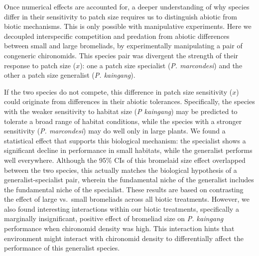 Once numerical effects are accounted for, a deeper understanding of why
species differ in their sensitivity to patch size requires us to
distinguish abiotic from biotic mechanisms. This is only possible with
manipulative experiments. Here we decoupled interspecific competition
and predation from abiotic differences between small and large
bromeliads, by experimentally manipulating a pair of congeneric
chironomids. This species pair was divergent the strength of their
response to patch size (\(x\)): one a patch size specialist (\emph{P.
marcondesi}) and the other a patch size generalist (\emph{P. kaingang}).

If the two species do not compete, this difference in patch size
sensitivity (\(x\)) could originate from differences in their abiotic
tolerances. Specifically, the species with the weaker sensitivity to
habitat size (\emph{P kaingang}) may be predicted to tolerate a broad
range of habitat conditions, while the species with a stronger
sensitivity (\emph{P. marcondesi}) may do well only in large plants. We
found a statistical effect that supports this biological mechanism: the
specialist shows a significant decline in performance in small habitats,
while the generalist performs well everywhere. Although the 95\% CIs of
this bromelaid size effect overlapped between the two species, this
actually matches the biological hypothesis of a generalist-specialist
pair, wherein the fundamental niche of the generalist includes the
fundamental niche of the specialist. These results are based on
contrasting the effect of large vs.~small bromeliads across all biotic
treatments. However, we also found interesting interactions within our
biotic treatments, specifically a marginally insignificant, positive
effect of bromeliad size on \emph{P. kaingang} performance when
chironomid density was high. This interaction hints that environment
might interact with chironomid density to differentially affect the
performance of this generalist species.

